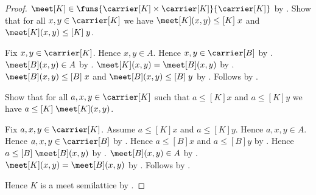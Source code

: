 \begin{proof}
    $\meet[K]\in
        \funs{\carrier[K]\times\carrier[K]}{\carrier[K]}$ by
        .
    Show that for all $x,y\in\carrier[K]$ we have
        $\meet[K](x,y)\mathrel{\leq[K]}x$ and
        $\meet[K](x,y)\mathrel{\leq[K]}y$.
    \begin{subproof}
        Fix $x,y\in\carrier[K]$.
        Hence $x,y\in A$.
        Hence $x,y\in\carrier[B]$ by .
        $\meet[B](x,y)\in A$ by .
        $\meet[K](x,y)=\meet[B](x,y)$ by
            .
        $\meet[B](x,y)\mathrel{\leq[B]}x$ and
            $\meet[B](x,y)\mathrel{\leq[B]}y$ by
            .
        Follows by
            .
    \end{subproof}
    Show that for all $a,x,y\in\carrier[K]$ such that
        $a\mathrel{\leq[K]}x$ and $a\mathrel{\leq[K]}y$ we have
        $a\mathrel{\leq[K]}\meet[K](x,y)$.
    \begin{subproof}
        Fix $a,x,y\in\carrier[K]$.
        Assume $a\mathrel{\leq[K]}x$ and $a\mathrel{\leq[K]}y$.
        Hence $a,x,y\in A$.
        Hence $a,x,y\in\carrier[B]$ by .
        Hence $a\mathrel{\leq[B]}x$ and $a\mathrel{\leq[B]}y$ by
            .
        Hence $a\mathrel{\leq[B]}\meet[B](x,y)$ by .
        $\meet[B](x,y)\in A$ by .
        $\meet[K](x,y)=\meet[B](x,y)$ by
            .
        Follows by
            .
    \end{subproof}
    Hence $K$ is a meet semilattice by
        .


\end{proof}
